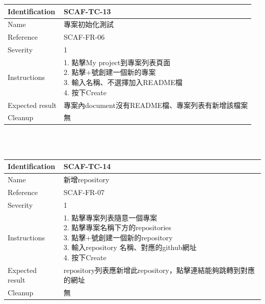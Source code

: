 \documentclass{report}
\begin{document}
\begin{tabularx}{\textwidth}{
  |p{}%
  |p{}|%
  }
  \hline
  \centering Identification &  SCAF-TC-13 \\
  \hline
  \centering Name & 專案初始化測試 \\
  \hline
  \centering Reference & SCAF-FR-06 \\
  \hline
  \centering Severity & 1 \\
  \hline
  \centering Instructions & 
  \makecell[l]{
    1. 點擊My project到專案列表頁面  \\
    2. 點擊+號創建一個新的專案  \\
    3. 輸入名稱、不選擇加入README檔  \\
    4. 按下Create
  }\\
  \hline
  \centering Expected result & 專案內document沒有README檔、專案列表有新增該檔案 \\
  \hline
  \centering Cleanup & 無 \\
  \hline
\end{tabularx}
\\
\newline
\\
\begin{tabularx}{\textwidth}{
  |p{}%
  |p{}|%
  }
  \hline
  \centering Identification &  SCAF-TC-14 \\
  \hline
  \centering Name & 新增repository \\
  \hline
  \centering Reference & SCAF-FR-07 \\
  \hline
  \centering Severity & 1 \\
  \hline
  \centering Instructions & 
  \makecell[l]{
    1. 點擊專案列表隨意一個專案 \\
    2. 點擊專案名稱下方的repositories \\
    3. 點擊+號創建一個新的repository \\
    3. 輸入repository 名稱、對應的github網址  \\
    4. 按下Create
  }\\
  \hline
  \centering Expected result & repository列表應新增此repository，點擊連結能夠跳轉到對應的網址 \\
  \hline
  \centering Cleanup & 無 \\
  \hline
\end{tabularx}
\\
\end{document}
